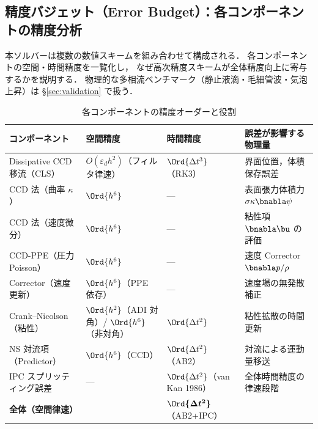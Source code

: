 %

\subsection{精度バジェット（Error Budget）：各コンポーネントの精度分析}
\label{sec:error_budget}

本ソルバーは複数の数値スキームを組み合わせて構成される．
各コンポーネントの空間・時間精度を一覧化し，
なぜ高次精度スキームが全体精度向上に寄与するかを説明する．
物理的な多相流ベンチマーク（静止液滴・毛細管波・気泡上昇）は §\ref{sec:validation} で扱う．

\begin{table}[htbp]
\centering
\caption{各コンポーネントの精度オーダーと役割}
\label{tab:error_budget}
\renewcommand{\arraystretch}{1.35}
\begin{tabular}{>{\raggedright\arraybackslash}p{32mm}>{\raggedright\arraybackslash}p{28mm}>{\raggedright\arraybackslash}p{28mm}>{\raggedright\arraybackslash}p{48mm}}
\toprule
コンポーネント & 空間精度 & 時間精度 & 誤差が影響する物理量 \\
\midrule
Dissipative CCD 移流（CLS） & $O(\varepsilon_d h^2)$（フィルタ律速） & $\Ord{\Delta t^3}$（RK3） & 界面位置，体積保存誤差 \\
CCD 法（曲率 $\kappa$） & $\Ord{h^6}$ & — & 表面張力体積力 $\sigma\kappa\bnabla\psi$ \\
CCD 法（速度微分） & $\Ord{h^6}$ & — & 粘性項 $\bnabla\bu$ の評価 \\
CCD-PPE（圧力 Poisson） & $\Ord{h^6}$ & — & 速度 Corrector $\bnabla p/\rho$ \\
Corrector（速度更新） & $\Ord{h^6}$（PPE 依存） & — & 速度場の無発散補正 \\
Crank--Nicolson（粘性） & $\Ord{h^2}$（ADI 対角）/ $\Ord{h^6}$（非対角） & $\Ord{\Delta t^2}$ & 粘性拡散の時間更新 \\
NS 対流項（Predictor） & $\Ord{h^6}$（CCD） & $\Ord{\Delta t^2}$（AB2） & 対流による運動量移送 \\
IPC スプリッティング誤差 & — & $\Ord{\Delta t^2}$（van Kan 1986） & 全体時間精度の律速段階 \\
\midrule
\textbf{全体（空間律速）} & \multicolumn{1}{>{\raggedright\arraybackslash}p{28mm}}{$\boldsymbol{\Ord{h^2}}$（CSF $O(\varepsilon^2)$）} & $\boldsymbol{\Ord{\Delta t^2}}$（AB2+IPC） & \\
\bottomrule
\end{tabular}
\end{table}

